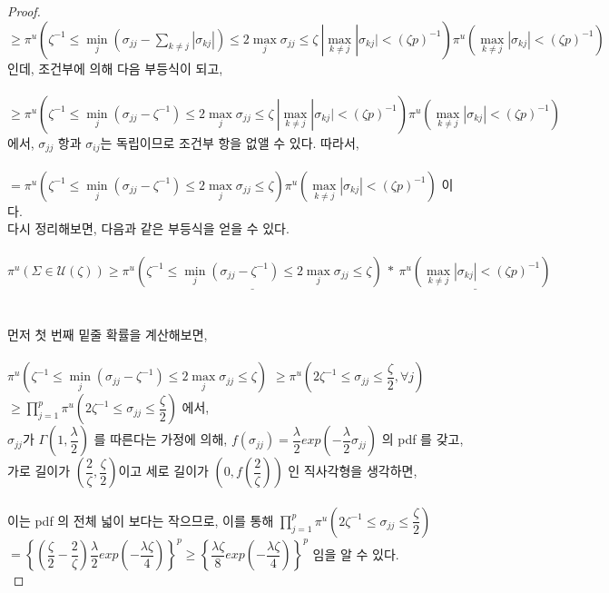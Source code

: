 \begin{proof}
\\
$\geq \pi^u(\zeta^{-1}\leq\min\limits_{j}(\sigma_{jj}-\sum\limits_{k\neq j}|\sigma_{kj}|)\leq 2\max\limits_{j}\sigma_{jj}\leq\zeta \ | \max\limits_{k \neq j}|\sigma_{kj}|< (\zeta p)^{-1} )\pi^u(\max\limits_{k \neq j}|\sigma_{kj}|< (\zeta p)^{-1})$ 인데, 조건부에 의해 다음 부등식이 되고,\\
\\
$\geq \pi^u(\zeta^{-1}\leq\min\limits_{j}(\sigma_{jj}-\zeta^{-1})\leq 2\max\limits_{j}\sigma_{jj}\leq\zeta \ | \max\limits_{k \neq j}|\sigma_{kj}|< (\zeta p)^{-1} )\pi^u(\max\limits_{k \neq j}|\sigma_{kj}|< (\zeta p)^{-1})$ 에서, $\sigma_{jj}$ 항과 $\sigma_{ij}$는 독립이므로 조건부 항을 없앨 수 있다. 따라서,\\
\\
$=\pi^u(\zeta^{-1}\leq\min\limits_{j}(\sigma_{jj}-\zeta^{-1})\leq 2\max\limits_{j}\sigma_{jj}\leq\zeta)\pi^u(\max\limits_{k \neq j}|\sigma_{kj}|< (\zeta p)^{-1})$ 이다.\\
다시 정리해보면, 다음과 같은 부등식을 얻을 수 있다.\\
\\
$\pi^u(\Sigma \in \mathcal{U}(\zeta)) \geq \underline{\pi^u(\zeta^{-1}\leq\min\limits_{j}(\sigma_{jj}-\zeta^{-1})\leq 2\max\limits_{j}\sigma_{jj}\leq\zeta)} \ * \ \underline{\pi^u(\max\limits_{k \neq j}|\sigma_{kj}|< (\zeta p)^{-1})}$\\
\\
\\
먼저 첫 번째 밑줄 확률을 계산해보면,\\
\\
$\pi^u(\zeta^{-1}\leq\min\limits_{j}(\sigma_{jj}-\zeta^{-1})\leq 2\max\limits_{j}\sigma_{jj}\leq\zeta)$ $\geq \pi^u(2\zeta^{-1} \leq \sigma_{jj} \leq \dfrac{\zeta}{2}, \forall j)$\\
$\geq \prod\limits_{j=1}^p \pi^u(2\zeta^{-1}\leq \sigma_{jj} \leq \dfrac{\zeta}{2})$ 에서,\\
$\sigma_{jj}$가 $\Gamma(1,\dfrac{\lambda}{2})$ 를 따른다는 가정에 의해, $f(\sigma_{jj})=\dfrac{\lambda}{2}exp(-\dfrac{\lambda}{2}\sigma_{jj})$ 의 pdf 를 갖고, 가로 길이가 $\left(\dfrac{2}{\zeta},\dfrac{\zeta}{2}\right)$이고 세로 길이가 $\left(0,f\left(\dfrac{2}{\zeta}\right)\right)$ 인 직사각형을 생각하면, \\
\\
이는 pdf 의 전체 넓이 보다는 작으므로, 이를 통해 $\prod\limits_{j=1}^p\pi^u(2\zeta^{-1}\leq \sigma_{jj} \leq \dfrac{\zeta}{2})$\\
$=\left\{\left(\dfrac{\zeta}{2}-\dfrac{2}{\zeta}\right)\dfrac{\lambda}{2}exp(-\dfrac{\lambda \zeta}{4})\right\}^p \geq \left\{ \dfrac{\lambda \zeta}{8} exp(-\dfrac{\lambda \zeta}{4})\right\}^p$ 임을 알 수 있다.\\

\end{proof}
